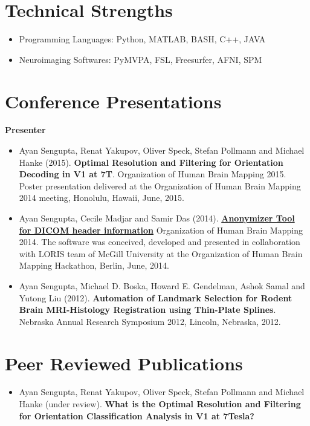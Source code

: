 \documentclass[line, margin]{res}
\begin{document}
\begin{resume}
\section{Technical Strengths}
\begin{itemize}
    \item Programming Languages: Python, MATLAB, BASH, C++, JAVA
    \item Neuroimaging Softwares: PyMVPA, FSL, Freesurfer, AFNI, SPM
\end{itemize}


\section{Conference Presentations}
\textbf{Presenter}
\begin{itemize}
    \item Ayan Sengupta, Renat Yakupov, Oliver Speck, Stefan Pollmann and Michael Hanke (2015). \textbf{Optimal Resolution and Filtering for Orientation Decoding in V1 at 7T}. Organization of Human Brain Mapping 2015.  Poster presentation delivered at the Organization of Human Brain Mapping 2014 meeting, Honolulu, Hawaii, June, 2015. 

    \item Ayan Sengupta, Cecile Madjar and Samir Das (2014). \href{https://github.com/aces/DICOM_anonymizer/blob/master/README.md}{\textbf{Anonymizer Tool for DICOM header information}} Organization of Human Brain Mapping 2014. The software was conceived, developed and presented in collaboration with LORIS team of McGill University at the Organization of Human Brain Mapping Hackathon, Berlin, June, 2014.

    \item Ayan Sengupta, Michael D. Boska, Howard E. Gendelman, Ashok Samal and Yutong Liu (2012). \textbf{Automation of Landmark Selection for Rodent Brain MRI-Histology Registration using Thin-Plate Splines}. Nebraska Annual Research Symposium 2012, Lincoln, Nebraska, 2012. 

 
\end{itemize}




\section{Peer Reviewed Publications}
\begin{itemize}
    \item Ayan Sengupta, Renat Yakupov, Oliver Speck, Stefan Pollmann and Michael Hanke (under review). \textbf{What is the Optimal Resolution and Filtering for Orientation Classification Analysis in V1 at 7Tesla?}
  

\end{itemize}
\end{resume}
\end{document}
